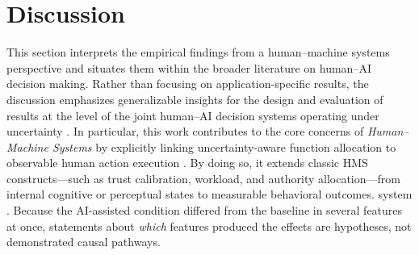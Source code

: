 \documentclass[journal]{IEEEtran}
\theoremstyle{plain}
\theoremstyle{definition}
\providecommand{\DIFaddtex}[1]{{\protect\color{blue} \sf #1}} %
\providecommand{\DIFdeltex}[1]{{\protect\color{red} \scriptsize #1}} %
\providecommand{\DIFaddbegin}{} %
\providecommand{\DIFaddend}{} %
\providecommand{\DIFdelbegin}{} %
\providecommand{\DIFdelend}{} %
\providecommand{\DIFadd}[1]{\texorpdfstring{\DIFaddtex{#1}}{#1}} %
\providecommand{\DIFdel}[1]{\texorpdfstring{\DIFdeltex{#1}}{}} %
\newcommand{\DIFscaledelfig}{0.5}
\newlength{\DIFdelgraphicswidth} %
\newlength{\DIFdelgraphicsheight} %
\newcommand{\DIFaddincludegraphics}[2][]{{\color{blue}\fbox{\DIFOincludegraphics[#1]{#2}}}} %
\newcommand{\DIFdelincludegraphics}[2][]{%
\sbox{\DIFdelgraphicsbox}{\DIFOincludegraphics[#1]{#2}}%
\settoboxwidth{\DIFdelgraphicswidth}{\DIFdelgraphicsbox} %
\settoboxtotalheight{\DIFdelgraphicsheight}{\DIFdelgraphicsbox} %
\scalebox{\DIFscaledelfig}{%
\parbox[b]{\DIFdelgraphicswidth}{\usebox{\DIFdelgraphicsbox}\\[-\baselineskip] \rule{\DIFdelgraphicswidth}{0em}}\llap{\resizebox{\DIFdelgraphicswidth}{\DIFdelgraphicsheight}{%
\setlength{\unitlength}{\DIFdelgraphicswidth}%
\begin{picture}(1,1)%
\thicklines\linethickness{2pt} %
{\color[rgb]{1,0,0}\put(0,0){\framebox(1,1){}}}%
{\color[rgb]{1,0,0}\put(0,0){\line( 1,1){1}}}%
{\color[rgb]{1,0,0}\put(0,1){\line(1,-1){1}}}%
\end{picture}%
}\hspace*{3pt}}} %
} %
\DeclareRobustCommand{\DIFaddbegin}{\DIFOaddbegin \let\includegraphics\DIFaddincludegraphics} %
\DeclareRobustCommand{\DIFaddend}{\DIFOaddend \let\includegraphics\DIFOincludegraphics} %
\DeclareRobustCommand{\DIFdelbegin}{\DIFOdelbegin \let\includegraphics\DIFdelincludegraphics} %
\DeclareRobustCommand{\DIFdelend}{\DIFOaddend \let\includegraphics\DIFOincludegraphics} %
\begin{document}
\section{Discussion}
\DIFaddbegin \label{sec:discussion}
\DIFaddend This section interprets the \DIFdelbegin \DIFdel{empirical findings from a human--machine systems perspective and situates them within the broader literature on human--AI decision making. Rather than focusing on application-specific results, the discussion emphasizes generalizable insights for the design and evaluation of }\DIFdelend \DIFaddbegin \DIFadd{results at the level of the joint }\DIFaddend human--AI \DIFdelbegin \DIFdel{decision systems operating under uncertainty \cite{Bach2024Access,PerezCerrolaza2024CSUR,Lai2023FAccT,Yang2022THMSReview}. In particular, this work contributes to the core concerns of \textit{Human--Machine Systems} by explicitly linking uncertainty-aware function allocation to observable human action execution . By doing so, it extends classic HMS constructs---such as trust calibration, workload, and authority allocation---from internal cognitive or perceptual states to measurable behavioral outcomes. }\DIFdelend \DIFaddbegin \DIFadd{system \cite{Hollnagel2005JCS,Woods2006JCS}. Because the AI-assisted condition differed from the baseline in several features at once, statements about \emph{which} features produced the effects are hypotheses, not demonstrated causal pathways.
}\DIFaddend 
\end{document}
